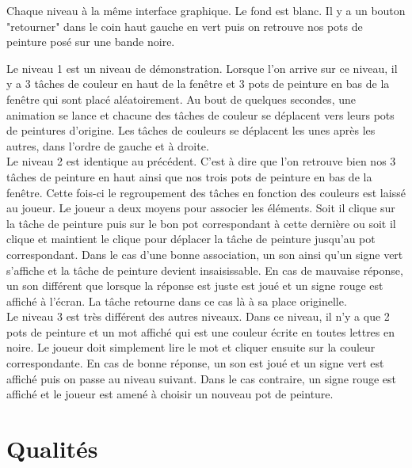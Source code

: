 \documentclass{article}
\begin{document}
Chaque niveau à la même interface graphique. Le fond est blanc. Il y a un bouton "retourner" dans le coin haut gauche en vert puis on retrouve nos pots de peinture posé sur une bande noire.

Le niveau 1 est un niveau de démonstration. Lorsque l'on arrive sur ce niveau, il y a 3 tâches de couleur en haut de la fenêtre et 3 pots de peinture en bas de la fenêtre qui sont placé aléatoirement. Au bout de quelques secondes, une animation se lance et chacune des tâches de couleur se déplacent vers leurs pots de peintures d'origine. Les tâches de couleurs se déplacent les unes après les autres, dans l'ordre de gauche et à droite.\\

Le niveau 2 est identique au précédent. C'est à dire que l'on retrouve bien nos 3 tâches de peinture en haut ainsi que nos trois pots de peinture en bas de la fenêtre. Cette fois-ci le regroupement des tâches en fonction des couleurs est laissé au joueur. Le joueur a deux moyens pour associer les éléments. Soit il clique sur la tâche de peinture puis sur le bon pot correspondant à cette dernière ou soit il clique et maintient le clique pour déplacer la tâche de peinture jusqu'au pot correspondant. Dans le cas d'une bonne association, un son ainsi qu'un signe vert s'affiche et la tâche de peinture devient insaisissable. En cas de mauvaise réponse, un son différent que lorsque la réponse est juste est joué et un signe rouge est affiché à l'écran. La tâche retourne dans ce cas là à sa place originelle.\\

Le niveau 3 est très différent des autres niveaux. Dans ce niveau, il n'y a que 2 pots de peinture et un mot affiché qui est une couleur écrite en toutes lettres en noire. Le joueur doit simplement lire le mot et cliquer ensuite sur la couleur correspondante. En cas de bonne réponse, un son est joué et un signe vert est affiché puis on passe au niveau suivant. Dans le cas contraire, un signe rouge est affiché et le joueur est amené à choisir un nouveau pot de peinture.


\section{Qualités}
\end{document}
